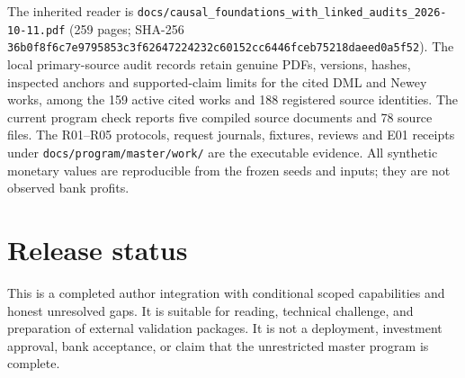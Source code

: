 \documentclass[11pt,a4paper]{article}
\begin{document}
The inherited reader is
\texttt{docs/causal\_foundations\_with\_linked\_audits\_2026-10-11.pdf}
(259 pages; SHA-256
\texttt{36b0f8f6c7e9795853c3f62647224232c60152cc6446fceb75218daeed0a5f52}).
The local primary-source audit records retain genuine PDFs, versions, hashes,
inspected anchors and supported-claim limits for the cited DML and Newey
works, among the 159 active cited works and 188 registered source identities.
The current program check reports five compiled source documents and 78 source
files. The R01--R05 protocols, request journals, fixtures, reviews and E01
receipts under \texttt{docs/program/master/work/} are the executable evidence.
All synthetic monetary values are reproducible from the frozen seeds and
inputs; they are not observed bank profits.

\section*{Release status}

This is a completed author integration with conditional scoped capabilities
and honest unresolved gaps. It is suitable for reading, technical challenge,
and preparation of external validation packages. It is not a deployment,
investment approval, bank acceptance, or claim that the unrestricted master
program is complete.
\end{document}

